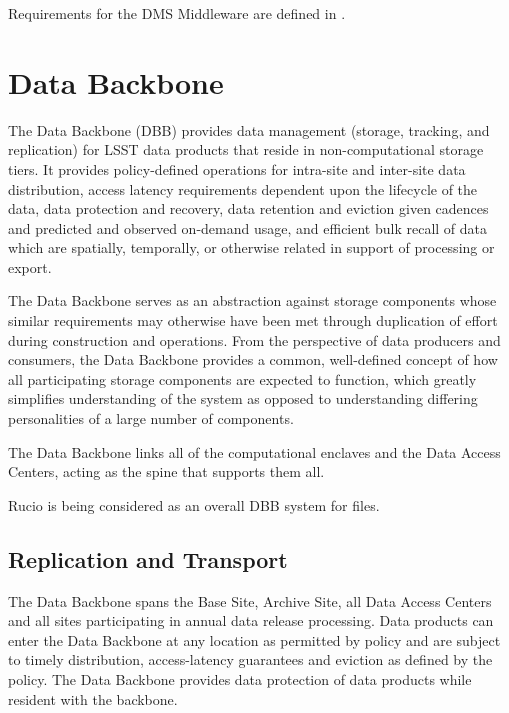 \documentclass[DM,lsstdraft,toc]{lsstdoc}
\begin{document}
Requirements for the DMS Middleware are defined in .

\section{Data Backbone}\label{data-backbone}

The Data Backbone (DBB) provides data management (storage, tracking, and
replication) for LSST data products that reside in non-computational storage
tiers.  It provides policy-defined operations for intra-site and inter-site
data distribution, access latency requirements dependent upon the lifecycle of
the data, data protection and recovery, data retention and eviction given
cadences and predicted and observed on-demand usage, and efficient bulk recall
of data which are spatially, temporally, or otherwise related in support of
processing or export.

The Data Backbone serves as an abstraction against storage components whose
similar requirements may otherwise have been met through duplication of effort
during construction and operations. From the perspective of data producers and
consumers, the Data Backbone provides a common, well-defined concept of how all
participating storage components are expected to function, which greatly
simplifies understanding of the system as opposed to understanding differing
personalities of a large number of components.

The Data Backbone links all of the computational enclaves and the Data Access
Centers, acting as the spine that supports them all.

Rucio \citep{Rucio} is being considered as an overall DBB system for files.

\subsection{Replication and Transport}\label{dbb-replication-and-transport}

The Data Backbone spans the Base Site, Archive Site, all Data Access Centers
and all sites participating in annual data release processing.  Data products
can enter the Data Backbone at any location as permitted by policy and are
subject to timely distribution, access-latency guarantees and eviction as
defined by the policy. The Data Backbone provides data protection of data
products while resident with the backbone.
\end{document}

